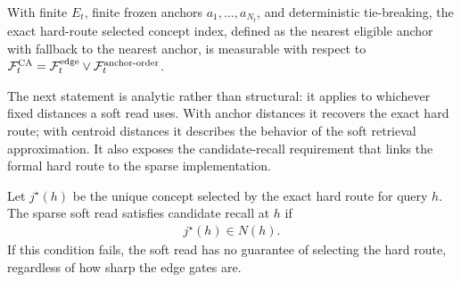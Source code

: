 \begin{theorem}
\label{thm:hard-dgm-measurable:informal}
With finite $E_t$, finite frozen anchors $a_1,\ldots,a_{N_t}$, and deterministic tie-breaking, the exact hard-route selected concept index, defined as the nearest eligible anchor with fallback to the nearest anchor, is measurable with respect to $\mathcal{F}_t^{\mathrm{CA}}=\mathcal{F}_t^{\mathrm{edge}}\vee \mathcal{F}_t^{\mathrm{anchor\text{-}order}}$.
\end{theorem}

The next statement is analytic rather than structural: it applies to whichever fixed distances a soft read uses. With anchor distances it recovers the exact hard route; with centroid distances it describes the behavior of the soft retrieval approximation. It also exposes the candidate-recall requirement that links the formal hard route to the sparse implementation.

\begin{condition}
\label{cond:candidate-recall}
Let $j^\star(h)$ be the unique concept selected by the exact hard route for query $h$. The sparse soft read satisfies candidate recall at $h$ if
\begin{align*}
j^\star(h)\in N(h).
\end{align*}
If this condition fails, the soft read has no guarantee of selecting the hard route, regardless of how sharp the edge gates are.
\end{condition}

